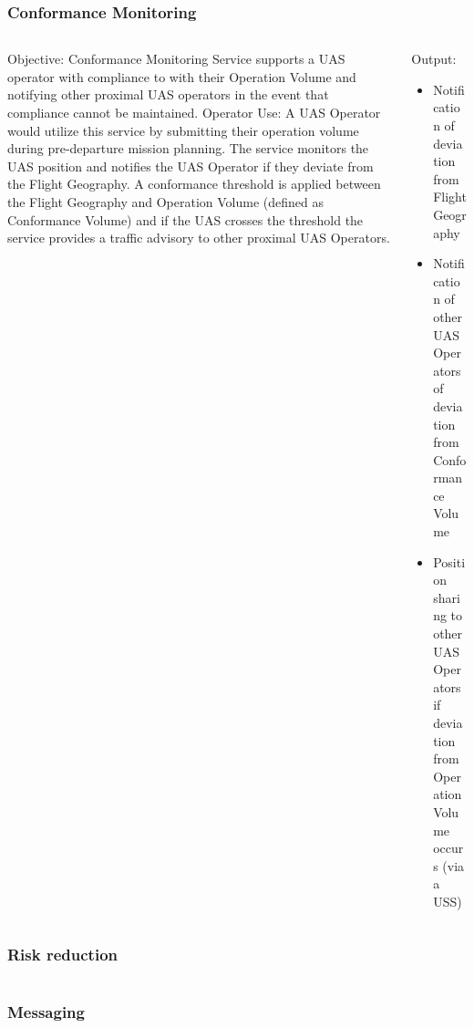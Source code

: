 \documentclass[usenames,dvipsnames,aspectratio=169,serif]{beamer}
\begin{document}
\begin{frame}
   \frametitle{Conformance Monitoring}
   \begin{columns}[t]
      \begin{column}{0.5\textwidth}
         Objective: Conformance Monitoring Service supports a UAS operator with compliance to with their Operation Volume and notifying other proximal UAS operators in the event that compliance cannot be maintained.
         Operator Use: A UAS Operator would utilize this service by submitting their operation volume during pre-departure mission planning. The service monitors the UAS position and notifies the UAS Operator if they deviate from the Flight Geography. A conformance threshold is applied between the Flight Geography and Operation Volume (defined as Conformance Volume) and if the UAS crosses the threshold the service provides a traffic advisory to other proximal UAS Operators.
      \end{column}
      \begin{column}{0.5\textwidth}
         Output:
         \begin{itemize}
         \item  Notification of deviation from Flight Geography
         \item  Notification of other UAS Operators of deviation from Conformance Volume
         \item  Position sharing to other UAS Operators if deviation from Operation Volume occurs (via a USS)
         \end{itemize}
      \end{column}
   \end{columns}
\end{frame}

\begin{frame}
   \frametitle{Risk reduction}
   \begin{columns}[t]
      \begin{column}{0.5\textwidth}
      \end{column}
      \begin{column}{0.5\textwidth}
      \end{column}
   \end{columns}
\end{frame}

\begin{frame}
   \frametitle{Messaging}
   \begin{columns}[t]
      \begin{column}{0.5\textwidth}
      \end{column}
      \begin{column}{0.5\textwidth}
      \end{column}
   \end{columns}
\end{frame}
\end{document}
